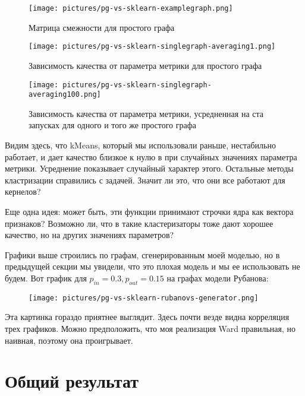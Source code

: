 \documentclass{article}
\begin{document}
\begin{figure}[H]
	\texttt{[image: pictures/pg-vs-sklearn-examplegraph.png]}
	\caption{\label{f_vs2} Матрица смежности для простого графа}
\end{figure}

\begin{figure}[H]
	\texttt{[image: pictures/pg-vs-sklearn-singlegraph-averaging1.png]}
	\caption{\label{f_vs2} Зависимость качества от параметра метрики для простого графа}
\end{figure}

\begin{figure}[H]
	\texttt{[image: pictures/pg-vs-sklearn-singlegraph-averaging100.png]}
	\caption{\label{f_vs2} Зависимость качества от параметра метрики, усредненная на ста запусках для одного и того же простого графа}
\end{figure}

Видим здесь, что kMeans, который мы использовали раньше, нестабильно работает, и дает качество близкое к нулю в при случайных значениях параметра метрики. Усреднение показывает случайный характер этого. Остальные методы кластризации справились с задачей. Значит ли это, что они все работают для кернелов?

Еще одна идея: может быть, эти функции принимают строчки ядра как вектора признаков? Возможно ли, что в такие кластеризаторы тоже дают хорошее качество, но на других значениях параметров?

Графики выше строились по графам, сгенерированным моей моделью, но в предыдущей секции мы увидели, что это плохая модель и мы ее использовать не будем. Вот график для $p_{in} = 0.3, p_{out} = 0.15$ на графах модели Рубанова:


\begin{figure}[H]
	\texttt{[image: pictures/pg-vs-sklearn-rubanovs-generator.png]}
	\caption{\label{f_vs2}}
\end{figure}

Эта картинка гораздо приятнее выглядит. Здесь почти везде видна корреляция трех графиков. Можно предположить, что моя реализация Ward правильная, но наивная, поэтому она проигрывает.

\section*{Общий результат}
\end{document}
